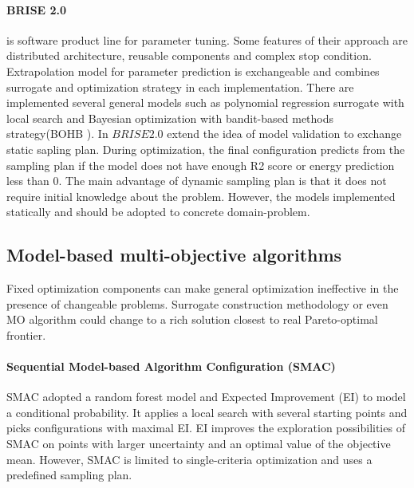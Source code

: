 
        \paragraph{BRISE 2.0} \cite{PukhkaievG18} is software product line for parameter tuning. Some features of their approach are distributed architecture, reusable components and complex stop condition. Extrapolation model for parameter prediction is exchangeable and combines surrogate and optimization strategy in each implementation. There are implemented several general models such as polynomial regression surrogate with local search and Bayesian optimization with bandit-based methods strategy(BOHB \cite{FalknerBOHB}). In $BRISE 2.0$ extend the idea of model validation to exchange static sapling plan. During optimization, the final configuration predicts from the sampling plan if the model does not have enough R2 score or energy prediction less than 0. The main advantage of dynamic sampling plan is that it does not require initial knowledge about the problem. However, the models implemented statically and should be adopted to concrete domain-problem.



    \subsection{Model-based multi-objective algorithms}
        Fixed optimization components can make general optimization ineffective in the presence of changeable problems. Surrogate construction methodology or even MO algorithm could change to a rich solution closest to real Pareto-optimal frontier.

        \paragraph{Sequential Model-based Algorithm Configuration (SMAC)} SMAC\cite{smac-2017} adopted a random forest model and Expected Improvement (EI) to model a conditional probability. It applies a local search with several starting points and picks configurations with maximal EI. EI improves the exploration possibilities of SMAC on points with larger uncertainty and an optimal value of the objective mean. However, SMAC is limited to single-criteria optimization and uses a predefined sampling plan.


